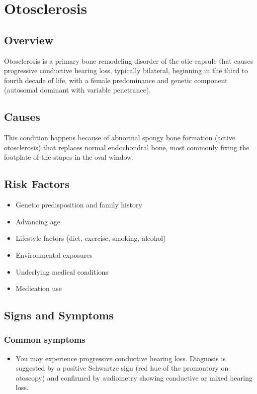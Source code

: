 \chapter{Otosclerosis}
\label{sec:Otosclerosis}

\section{Overview}
Otosclerosis is a primary bone remodeling disorder of the otic capsule that causes progressive conductive hearing loss, typically bilateral, beginning in the third to fourth decade of life, with a female predominance and genetic component (autosomal dominant with variable penetrance).
\section{Causes}
This condition happens because of abnormal spongy bone formation (active otosclerosis) that replaces normal endochondral bone, most commonly fixing the footplate of the stapes in the oval window.     
\section{Risk Factors}

\begin{itemize}[noitemsep]
  \item Genetic predisposition and family history
  \item Advancing age
  \item Lifestyle factors (diet, exercise, smoking, alcohol)
  \item Environmental exposures
  \item Underlying medical conditions
  \item Medication use
\end{itemize}
\section{Signs and Symptoms}

\subsection{Common symptoms}
\begin{itemize}[noitemsep]
  \item You may experience progressive conductive hearing loss. Diagnosis is suggested by a positive Schwartze sign (red hue of the promontory on otoscopy) and confirmed by audiometry showing conductive or mixed hearing loss. 
  \end{itemize}

